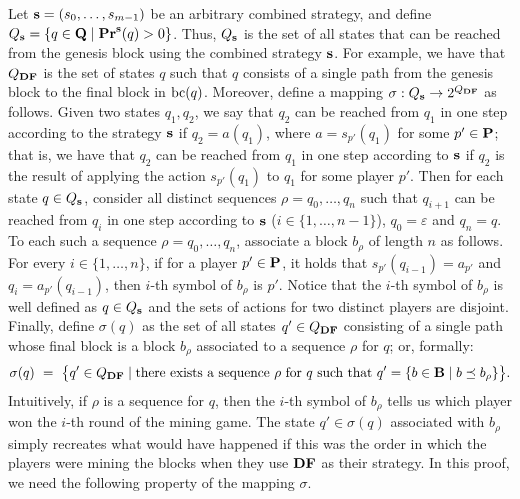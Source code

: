 Let $\mathbf{s}= (s_0, \ldots, s_{m-1})$ be an arbitrary combined strategy, and define $Q_{\mathbf{s}} = \{q \in \mathbf{Q} \mid \mathbf{Pr}^{\mathbf{s}}(q) > 0\}$. Thus, $Q_{\mathbf{s}}$ is the set of all states that can be reached from the genesis block using the combined strategy $\mathbf{s}$. For example, we have that $Q_{\text{\rm {\bf DF}}}$ is the set of states $q$ such that $q$ consists of a single path from the genesis block to the final block in $\text{bc}(q)$.
Moreover, define a mapping $\sigma: Q_{\mathbf{s}} \rightarrow 2^{Q_{\text{\rm {\bf DF}}}}$ as follows. Given two states $q_1, q_2$, we say that $q_2$ can be reached from $q_1$ in one step according to the strategy $\mathbf{s}$ if $q_2 = a(q_1)$, where $a = s_{p'}(q_1)$ for some $p' \in \mathbf{P}$;
that is, we have that $q_2$ can be reached from $q_1$ in one step according to $\mathbf{s}$ if $q_2$ is the result of applying the action $s_{p'}(q_1)$ to $q_1$ for some player $p'$.
Then for each state $q \in Q_{\mathbf{s}}$, consider all distinct sequences $\rho = q_0,\dots,q_n$ such that $q_{i+1}$ can be reached from 
$q_i$ in one step according to $\mathbf{s}$ ($i \in \{1, \ldots, n-1\}$), $q_0 = \varepsilon$ and $q_n = q$. To each such a sequence $\rho = q_0,\dots,q_n$, associate a block $b_\rho$ of length $n$ as follows.
For every $i \in \{1, \ldots, n\}$, if for a player $p' \in \mathbf{P}$, it holds that $s_{p'}(q_{i-1}) = a_{p'}$ and $q_{i} = a_{p'}(q_{i-1})$, then $i$-th symbol of $b_\rho$ is $p'$. Notice that the $i$-th symbol of $b_\rho$ is well defined as $q \in Q_{\mathbf{s}}$ and the sets of actions for two distinct players are disjoint.
Finally, define $\sigma(q)$ as the set of all states $q' \in Q_{\text{\rm {\bf DF}}}$ consisting of a single path whose final block is a block $b_\rho$ associated to a sequence $\rho$ for $q$; or, formally:
\begin{align*}
\sigma(q) \ = \ \big\{q' \in Q_{\text{\rm {\bf DF}}} \mid \text{there exists a sequence } \rho \text{ for } q \text{ such that } q' = \{ b \in \mathbf{B} \mid b \preceq b_\rho \}\big\}.
\end{align*}
Intuitively, if $\rho$ is a sequence for $q$, then the $i$-th symbol of $b_{\rho}$ tells us which player won the $i$-th round of the mining game. The state $q'\in \sigma(q)$ associated with $b_\rho$ simply recreates what would have happened if this was the order in which the players were mining the blocks when they use $\text{\rm {\bf DF}}$ as their strategy.
%
In this proof, we need the following property of the mapping $\sigma$.

